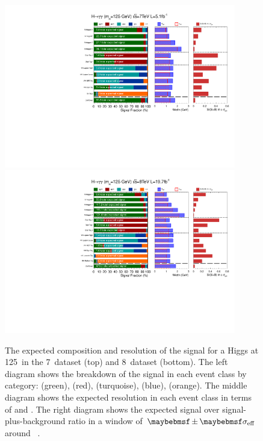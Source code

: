 
  
\begin{figure}
  \begin{center}
    \includegraphics[width=0.9\textwidth]{analysis/plots/ThesisFits/mva_7TeV/signalComposition_fix.pdf} \\
    \includegraphics[width=0.9\textwidth]{analysis/plots/ThesisFits/mva_8TeV/signalComposition_fix.pdf}
    \caption[The composition and width of the signal in each analysis category]{The expected composition and resolution of the signal for a \SM Higgs at 125~\GeV in the 7~\TeV dataset (top) and 8~\TeV dataset (bottom). The left diagram shows the breakdown of the signal in each event class by category: \ggH (green), \VBF (red), \WH (turquoise), \ZH (blue), \ttH (orange). The middle diagram shows the expected resolution in each event class in terms of \sigeff and \sigFW. The right diagram shows the expected signal over signal-plus-background ratio in a window of $\pm\sigeff$ around ~\GeV.}
    \label{fig:signal_composition}
  \end{center}
\end{figure}
  
